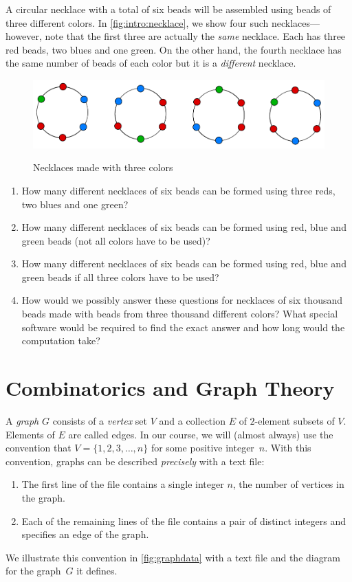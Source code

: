A circular necklace with a total of six beads will be assembled using beads
of three different colors.  In \autoref{fig:intro:necklace}, we show four such
necklaces---however, note that the first three are actually the \textit{same}
necklace.  Each has three red beads, two blues and one green.  On the 
other hand, the fourth necklace has the same number of beads of each color but
it is a \textit{different} necklace.

\begin{figure}
\begin{center}
\includegraphics[scale=.6]{intro-figs/necklaces}\\
\caption{Necklaces made with three colors} 
\label{fig:intro:necklace}
\end{center}
\end{figure}


\begin{enumerate}
\item How many different necklaces of six beads can be formed using three reds, two
blues and one green?
\item How many different necklaces of six beads can be formed using red, blue and green
beads (not all colors have to be used)?
\item How many different necklaces of six beads can be formed using red, blue and green
beads if all three colors have to be used?
\item How would we possibly answer these questions for necklaces of six 
thousand beads made with beads from three thousand different colors?
What special software would be required to find the exact answer and how
long would the computation take?
\end{enumerate}

\section{Combinatorics and Graph Theory}\label{s:intro:graph}

A \textit{graph} $G$ consists of a \textit{vertex} set $V$ and
a collection $E$ of $2$-element subsets of $ V$. Elements of $E$ are
called edges.  In our course, we will (almost always) use the convention
that $V=\{1,2,3,\dots,n\}$ for some positive integer~$n$.  With
this convention, graphs can be described \textit{precisely}
with a text file:
\begin{enumerate}
\item The first line of the file contains a single integer $n$, the
number of vertices in the graph.
\item Each of the remaining lines of the file contains a pair of 
distinct integers and specifies an edge of the graph.
\end{enumerate}
We illustrate this convention in \autoref{fig:graphdata} with a text 
file and the diagram for the graph~$G$ it defines.

